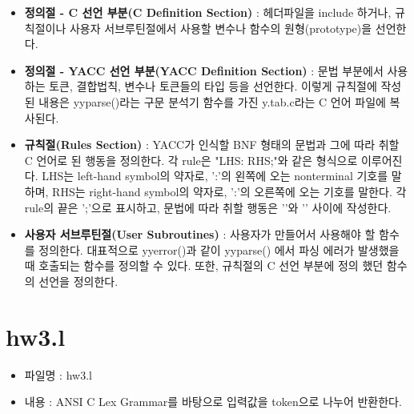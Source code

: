 \documentclass{article}
\begin{document}
\begin{itemize}
	\item {\bf 정의절 - C 선언 부분(C Definition Section)} : 헤더파일을 include 하거나,
	규칙절이나 사용자 서브루틴절에서 사용할 변수나 함수의 원형(prototype)을 선언한다.
	\item {\bf 정의절 - YACC 선언 부분(YACC Definition Section)} : 문법 부분에서 사용하는
	토큰, 결합법칙, 변수나 토큰들의 타입 등을 선언한다. 이렇게 규칙절에 작성된 내용은
	yyparse()라는 구문 분석기 함수를 가진 y.tab.c라는 C 언어 파일에 복사된다.
	\item {\bf 규칙절(Rules Section)} : YACC가 인식할 BNF 형태의 문법과 그에 따라 취할
	C 언어로 된 행동을 정의한다. 각 rule은 "LHS: RHS;"와 같은 형식으로 이루어진다. LHS는
	left-hand symbol의 약자로, ':'의 왼쪽에 오는 nonterminal 기호를 말하며, RHS는
	right-hand symbol의 약자로, ':'의 오른쪽에 오는 기호를 말한다. 각 rule의 끝은 ';'으로
	표시하고, 문법에 따라 취할 행동은 '{'와 '}' 사이에 작성한다.
	\item {\bf 사용자 서브루틴절(User Subroutines)} : 사용자가 만들어서 사용해야 할 함수를 정의한다.
	대표적으로 yyerror()과 같이 yyparse() 에서 파싱 에러가 발생했을 때 호출되는 함수를 정의할 수 있다.
	또한, 규칙절의 C 선언 부분에 정의 했던 함수의 선언을 정의한다.
\end{itemize}

\newpage

\section{hw3.l}

\begin{itemize}
	\item 파일명 : hw3.l
	\item 내용 : ANSI C Lex Grammar를 바탕으로 입력값을 token으로 나누어 반환한다.
\end{itemize}
\end{document}

